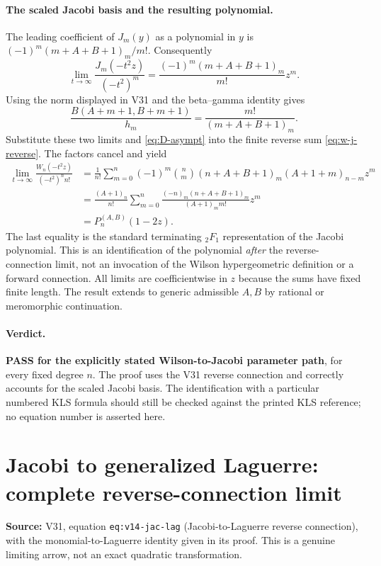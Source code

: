 \documentclass[11pt]{article}
\begin{document}
\paragraph{The scaled Jacobi basis and the resulting polynomial.}
The leading coefficient of $J_m(y)$ as a polynomial in $y$ is
$(-1)^m(m+A+B+1)_m/m!$. Consequently
\[
 \lim_{t\to\infty}\frac{J_m(-t^2z)}{(-t^2)^m}
 =\frac{(-1)^m(m+A+B+1)_m}{m!}z^m.
\]
Using the norm displayed in V31 and the beta--gamma identity gives
\[
 \frac{B(A+m+1,B+m+1)}{h_m}
 =\frac{m!}{(m+A+B+1)_m}.
\]
Substitute these two limits and \eqref{eq:D-asympt} into the finite
reverse sum \eqref{eq:w-j-reverse}. The factors cancel and yield
\begin{align*}
 \lim_{t\to\infty}\frac{W_n(-t^2z)}{(-t^2)^n n!}
 &=\frac1{n!}\sum_{m=0}^n(-1)^m\binom nm
 (n+A+B+1)_m(A+1+m)_{n-m}z^m\\
 &=\frac{(A+1)_n}{n!}\sum_{m=0}^n
 \frac{(-n)_m(n+A+B+1)_m}{(A+1)_m m!}z^m\\
 &=P_n^{(A,B)}(1-2z).
\end{align*}
The last equality is the standard terminating ${}_2F_1$ representation
of the Jacobi polynomial. This is an identification of the polynomial
\emph{after} the reverse-connection limit, not an invocation of the
Wilson hypergeometric definition or a forward connection.
All limits are coefficientwise in $z$ because the sums have fixed finite
length. The result extends to generic admissible $A,B$ by rational or
meromorphic continuation.

\paragraph{Verdict.} \textbf{PASS for the explicitly stated Wilson-to-Jacobi
parameter path}, for every fixed degree $n$. The proof uses the V31
reverse connection and correctly accounts for the scaled Jacobi basis.
The identification with a particular numbered KLS formula should still
be checked against the printed KLS reference; no equation number is
asserted here.


\section{Jacobi to generalized Laguerre: complete reverse-connection limit}
\noindent\textbf{Source:} V31, equation \texttt{eq:v14-jac-lag} (Jacobi-to-Laguerre reverse connection), with the monomial-to-Laguerre identity given in its proof. This is a genuine limiting arrow, not an exact quadratic transformation.
\end{document}
